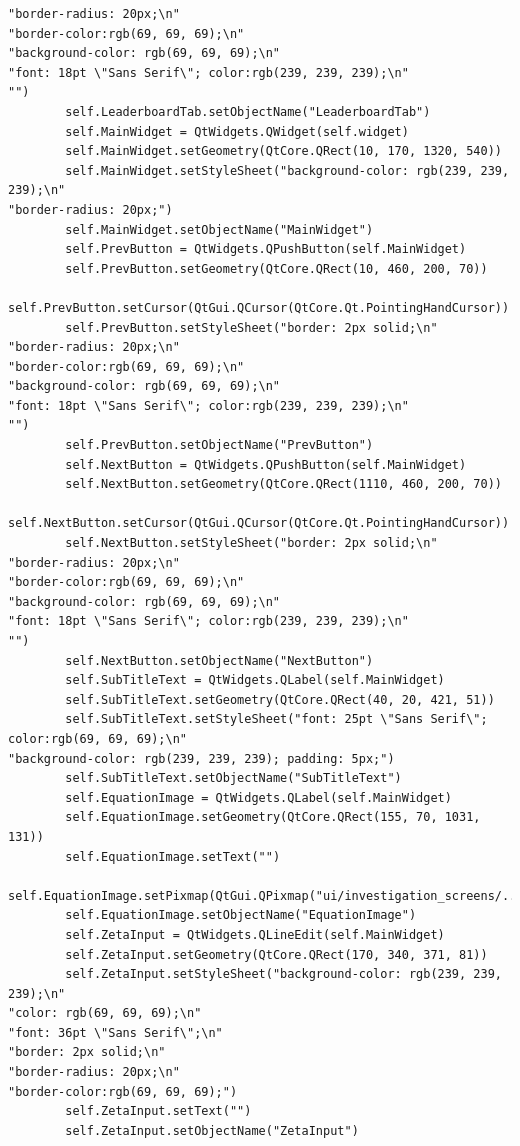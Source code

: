 \documentclass[12pt]{article}
\begin{document}
\begin{lstlisting}
"border-radius: 20px;\n"
"border-color:rgb(69, 69, 69);\n"
"background-color: rgb(69, 69, 69);\n"
"font: 18pt \"Sans Serif\"; color:rgb(239, 239, 239);\n"
"")
        self.LeaderboardTab.setObjectName("LeaderboardTab")
        self.MainWidget = QtWidgets.QWidget(self.widget)
        self.MainWidget.setGeometry(QtCore.QRect(10, 170, 1320, 540))
        self.MainWidget.setStyleSheet("background-color: rgb(239, 239, 239);\n"
"border-radius: 20px;")
        self.MainWidget.setObjectName("MainWidget")
        self.PrevButton = QtWidgets.QPushButton(self.MainWidget)
        self.PrevButton.setGeometry(QtCore.QRect(10, 460, 200, 70))
        self.PrevButton.setCursor(QtGui.QCursor(QtCore.Qt.PointingHandCursor))
        self.PrevButton.setStyleSheet("border: 2px solid;\n"
"border-radius: 20px;\n"
"border-color:rgb(69, 69, 69);\n"
"background-color: rgb(69, 69, 69);\n"
"font: 18pt \"Sans Serif\"; color:rgb(239, 239, 239);\n"
"")
        self.PrevButton.setObjectName("PrevButton")
        self.NextButton = QtWidgets.QPushButton(self.MainWidget)
        self.NextButton.setGeometry(QtCore.QRect(1110, 460, 200, 70))
        self.NextButton.setCursor(QtGui.QCursor(QtCore.Qt.PointingHandCursor))
        self.NextButton.setStyleSheet("border: 2px solid;\n"
"border-radius: 20px;\n"
"border-color:rgb(69, 69, 69);\n"
"background-color: rgb(69, 69, 69);\n"
"font: 18pt \"Sans Serif\"; color:rgb(239, 239, 239);\n"
"")
        self.NextButton.setObjectName("NextButton")
        self.SubTitleText = QtWidgets.QLabel(self.MainWidget)
        self.SubTitleText.setGeometry(QtCore.QRect(40, 20, 421, 51))
        self.SubTitleText.setStyleSheet("font: 25pt \"Sans Serif\"; color:rgb(69, 69, 69);\n"
"background-color: rgb(239, 239, 239); padding: 5px;")
        self.SubTitleText.setObjectName("SubTitleText")
        self.EquationImage = QtWidgets.QLabel(self.MainWidget)
        self.EquationImage.setGeometry(QtCore.QRect(155, 70, 1031, 131))
        self.EquationImage.setText("")
        self.EquationImage.setPixmap(QtGui.QPixmap("ui/investigation_screens/../../media/riemanns_functional_equation.png"))
        self.EquationImage.setObjectName("EquationImage")
        self.ZetaInput = QtWidgets.QLineEdit(self.MainWidget)
        self.ZetaInput.setGeometry(QtCore.QRect(170, 340, 371, 81))
        self.ZetaInput.setStyleSheet("background-color: rgb(239, 239, 239);\n"
"color: rgb(69, 69, 69);\n"
"font: 36pt \"Sans Serif\";\n"
"border: 2px solid;\n"
"border-radius: 20px;\n"
"border-color:rgb(69, 69, 69);")
        self.ZetaInput.setText("")
        self.ZetaInput.setObjectName("ZetaInput")

\end{lstlisting}
\end{document}
